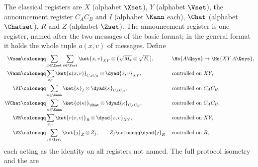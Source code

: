 
\begin{definition}\label{def:maps}
The classical registers are $X$ (alphabet $\Xset$), $Y$ (alphabet $\Vset$),
the announcement register $C_AC_B$ and $I$ (alphabet $\Kann$ each), $\Chat$
(alphabet $\Chatset$), $R$ and $Z$ (alphabet $\Zset$). The announcement
register is one register, named after the two messages of the basic format;
in the general format it holds the whole tuple $a(x,v)$ of messages. Define
\begin{align}
  \Vmsm &\coloneqq \sum_{x\in\Xset}\sum_{v\in\Vset}
    \ket{x,v}_{XY}\otimes\big(\sqrt{M_x}\otimes\sqrt{F_v}\big),
    &&\Hs{A\Qsys}\to\Hs{XY\,A\Qsys},\label{eq:Vmsm}\\
  \Vann &\coloneqq \sum_{x,v}\ket{a(x,v)}_{C_AC_B}\otimes\dyad{x,v}_{XY},
    &&\text{controlled on }XY,\label{eq:Vann}\\
  \VI &\coloneqq \sum_{\kappa\in\Kann}\ket{\kappa}_{I}\otimes
    \dyad{\kappa}_{C_AC_B},
    &&\text{controlled on }C_AC_B,\label{eq:VI}\\
  \VChat &\coloneqq \sum_{\kappa\in\Kann}\ket{\phi(\kappa)}_{\Chat}\otimes
    \dyad{\kappa}_{C_AC_B},
    &&\text{controlled on }C_AC_B,\label{eq:VChat}\\
  \VR &\coloneqq \sum_{x,v}\ket{r(x,v)}_{R}\otimes\dyad{x,v}_{XY},
    &&\text{controlled on }XY,\label{eq:VR}\\
  \VZ &\coloneqq \sum_{j\in\Zset}\ket{j}_{Z}\otimes Z_j,
    \qquad Z_j\coloneqq\dyad{j}_{R},
    &&\text{controlled on }R,\label{eq:VZ}
\end{align}
each acting as the identity on all registers not named. The full protocol
isometry and the
are
\begin{equation}\label{eq:Mprot}
\begin{gathered}

\end{gathered}
\end{equation}
\end{definition}
